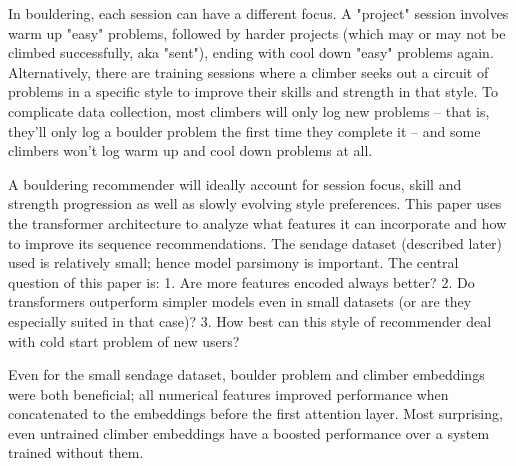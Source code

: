 \documentclass[10pt]{article}
\begin{document}
In bouldering, each session can have a different focus. A "project" session involves warm up "easy" problems, followed by harder projects (which may or may not be climbed successfully, aka "sent"), ending with cool down "easy" problems again. Alternatively, there are training sessions where a climber seeks out a circuit of problems in a specific style to improve their skills and strength in that style. To complicate data collection, most climbers will only log new problems -- that is, they'll only log a boulder problem the first time they complete it -- and some climbers won't log warm up and cool down problems at all.

A bouldering recommender will ideally account for session focus, skill and strength progression as well as slowly evolving style preferences. This paper uses the transformer architecture to analyze what features it can incorporate and how to improve its sequence recommendations. The sendage dataset (described later) used is relatively small; hence model parsimony is important. The central question of this paper is: 1. Are more features encoded always better? 2. Do transformers outperform simpler models even in small datasets (or are they especially suited in that case)? 3. How best can this style of recommender deal with cold start problem of new users?

Even for the small sendage dataset, boulder problem and climber embeddings were both beneficial; all numerical features improved performance when concatenated to the embeddings before the first attention layer. Most surprising, even untrained climber embeddings have a boosted performance over a system trained without them. 





\end{document}
